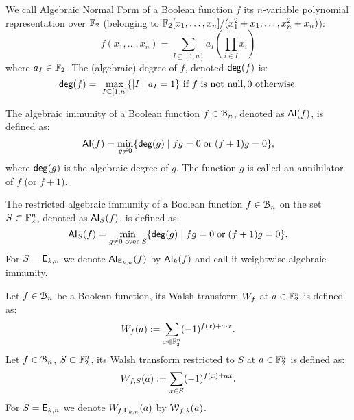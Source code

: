 \documentclass[11pt]{llncs}
\begin{document}
\begin{definition}\label{def:anf}
We call Algebraic Normal Form of a Boolean function $f$ its $n$-variable polynomial representation over $\mathbb{F}_2$ (\ie belonging to $\mathbb{F}_2[x_1,\dots,x_n]/(x_1^2+x_1,\dots,x_n^2+x_n)$):
	\[f(x_1,\dots,x_n)= \sum_{I \subseteq [1,n]} a_I \left( \prod_{i \in I} x_i \right) \]%
	where $a_I\in \mathbb{F}_2$. 
The (algebraic) degree of $f$, denoted $\mathsf{deg}(f)$ is: \[\mathsf{deg}(f)=\
\max_{I\subseteq [1,n]}\{ |I|\, | \, a_I=1\}  \text{ if $f$ is not null},0  \text{ otherwise}.\]
\end{definition}	


\begin{definition} \label{def:ai}
	The algebraic immunity of a Boolean function $f\in \mathcal{B}_{n}$, denoted as $\mathsf{AI}(f)$, is defined as:
	\[ \mathsf{AI}(f) = \min_{g \neq 0}\{ \mathsf{deg}(g) \; | \; fg = 0 \; \text{or} \; (f + 1)g = 0 \}{,} \]
	where $\mathsf{deg}(g)$ is the algebraic degree of $g$.
	The function $g$ is called an annihilator of $f$ (or $f + 1$). 
	
The restricted algebraic immunity of a Boolean function $f\in \mathcal{B}_{n}$ on the set $S\subset \mathbb{F}_2^n$, denoted as $\mathsf{AI}_S(f)$, is defined as:
\[ \mathsf{AI}_S(f) = \min_{g \neq 0 \text{ over } S}\{ \mathsf{deg}(g) \; | \; fg = 0 \; \text{or} \; (f + 1)g = 0 \}{.} \]	
For $S=\mathsf{E}_{k,n}$ we denote $\mathsf{AI}_{\mathsf{E}_{k,n}}(f)$ by $\mathsf{AI}_{k}(f)$ and call it weightwise algebraic immunity.
	
	
\end{definition}



\begin{definition}\label{def:walsh_transform}
	Let $f\in \mathcal{B}_{n}$ be a Boolean function, its Walsh transform $W_{f}$ at $a \in \mathbb{F}_2^n$ is defined as:
	\[  W_{f} (a) := \sum_{x \in \mathbb{F}_2^n} (-1)^{f(x) +  a \cdot x }.\]
	Let $f\in \mathcal{B}_{n}$, $S \subset \mathbb{F}_2^n$, its Walsh transform restricted to $S$ at $a \in \mathbb{F}_2^n$ is defined as:
	\[  W_{f,S} (a) := \sum_{x\in S} (-1)^{f(x)+ax}.\]
	For $S=\mathsf{E}_{k,n}$ we denote $W_{f,\mathsf{E}_{k,n}} (a)$ by $\mathcal{W}_{f,k}(a)$.%
	
\end{definition}
\end{document}
